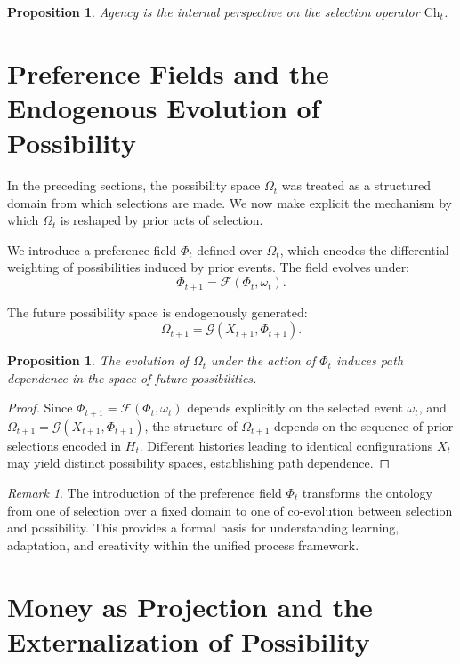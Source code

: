 \documentclass[11pt,a4paper]{article}
\newtheorem{proposition}[theorem]{Proposition}
\theoremstyle{definition}
\theoremstyle{remark}
\newtheorem{remark}[theorem]{Remark}
\begin{document}
\begin{proposition}
Agency is the internal perspective on the selection operator $\mathrm{Ch}_t$.
\end{proposition}

\section{Preference Fields and the Endogenous Evolution of Possibility}

In the preceding sections, the possibility space $\Omega_t$ was treated as a structured domain from which selections are made. We now make explicit the mechanism by which $\Omega_t$ is reshaped by prior acts of selection.

We introduce a preference field $\Phi_t$ defined over $\Omega_t$, which encodes the differential weighting of possibilities induced by prior events. The field evolves under:
\[
\Phi_{t+1} = \mathcal{F}(\Phi_t, \omega_t).
\]

The future possibility space is endogenously generated:
\[
\Omega_{t+1} = \mathcal{G}(X_{t+1}, \Phi_{t+1}).
\]

\begin{proposition}
The evolution of $\Omega_t$ under the action of $\Phi_t$ induces path dependence in the space of future possibilities.
\end{proposition}

\begin{proof}
Since $\Phi_{t+1} = \mathcal{F}(\Phi_t, \omega_t)$ depends explicitly on the selected event $\omega_t$, and $\Omega_{t+1} = \mathcal{G}(X_{t+1}, \Phi_{t+1})$, the structure of $\Omega_{t+1}$ depends on the sequence of prior selections encoded in $H_t$. Different histories leading to identical configurations $X_t$ may yield distinct possibility spaces, establishing path dependence.
\end{proof}

\begin{remark}
The introduction of the preference field $\Phi_t$ transforms the ontology from one of selection over a fixed domain to one of co-evolution between selection and possibility. This provides a formal basis for understanding learning, adaptation, and creativity within the unified process framework.
\end{remark}

\section{Money as Projection and the Externalization of Possibility}
\end{document}
